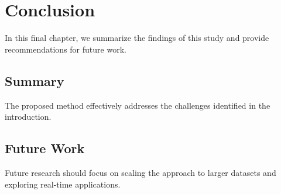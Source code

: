 \section{Conclusion}
\label{sec:conclusion}

In this final chapter, we summarize the findings of this study and provide recommendations for future work.

\subsection{Summary}
The proposed method effectively addresses the challenges identified in the introduction.

\subsection{Future Work}
Future research should focus on scaling the approach to larger datasets and exploring real-time applications.
